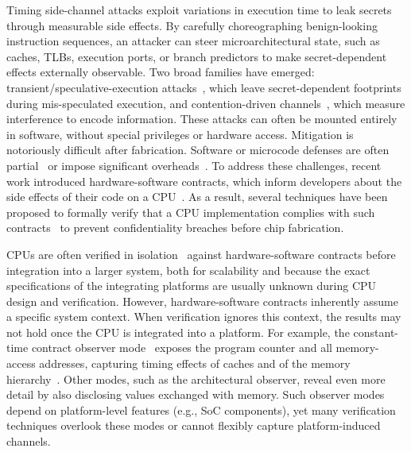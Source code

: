 

Timing side-channel attacks exploit variations in execution time to leak secrets through measurable side effects.
By carefully choreographing benign-looking instruction sequences, an attacker can steer microarchitectural state, such as caches, TLBs, execution ports, or branch predictors to make secret-dependent effects externally observable.
Two broad families have emerged: transient/speculative-execution attacks~\cite{kocher2019spectre,lipp2018meltdown,canella2019fallout,schwarz2019zombieload,van2019ridl,van2021cacheout,ragab2021rage,wikner2022retbleed,trujillo2023inception,wikner2023phantom,wikner2024breaking,wikner2025bpi}, which leave secret-dependent footprints during mis-speculated execution, and contention-driven channels~\cite{bernstein2005cache,Liu2015LLC,YaromFalkner2014FlushReload,Yarom2016CacheBleed,Moghimi2018MemJam,Gruss2016PrefetchSCA,Pessl2016DRAMA}, which measure interference to encode information.
These attacks can often be mounted entirely in software, without special privileges or hardware access.
Mitigation is notoriously difficult after fabrication.
Software or microcode defenses are often partial~\cite{ridlad} or impose significant overheads~\cite{herzog2021price}.
% 
To address these challenges, recent work introduced hardware-software contracts, which inform developers about the side effects of their code on a CPU~\cite{guarnieri2021hardware,oleksenko2022revizor}.
As a result, several techniques have been proposed to formally verify that a CPU implementation complies with such contracts~\cite{dinesh2024conjunct,dinesh2025h,ceesay2024mucfi,wang2023specification,tan2025contractshadowlogic,hsiao2024rtl2mmupath} to prevent confidentiality breaches before chip fabrication.

CPUs are often verified in isolation~\cite{dinesh2024conjunct,dinesh2025h,ceesay2024mucfi,wang2023specification,tan2025contractshadowlogic,hsiao2024rtl2mmupath} against hardware-software contracts before integration into a larger system, both for scalability and because the exact specifications of the integrating platforms are usually unknown during CPU design and verification.
However, hardware-software contracts inherently assume a specific system context. When verification ignores this context, the results may not hold once the CPU is integrated into a platform.
For example, the constant-time contract observer mode~\cite{guarnieri2021hardware} exposes the program counter and all memory-access addresses, capturing timing effects of caches and of the memory hierarchy~\cite{guarnieri2021hardware,oleksenko2022revizor}.
Other modes, such as the architectural observer, reveal even more detail by also disclosing values exchanged with memory.
Such observer modes depend on platform-level features (e.g., SoC components), yet many verification techniques overlook these modes or cannot flexibly capture platform-induced channels.

